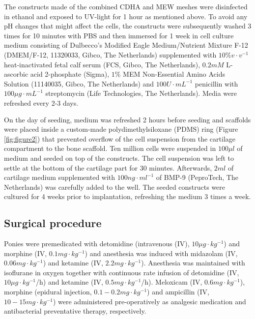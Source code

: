 \documentclass[twocolumn, empirical, authordate, issue]{jote-new-article}
\begin{document}
The constructs made of the combined CDHA and MEW meshes were disinfected in ethanol and exposed to UV-light for 1 hour as mentioned above. To avoid any pH changes that might affect the cells, the constructs were subsequently washed 3 times for 10 minutes with PBS and then immersed for 1 week in cell culture medium consisting of Dulbecco's Modified Eagle Medium/Nutrient Mixture F-12 (DMEM/F-12, 11320033, Gibco, The Netherlands) supplemented with $10\% v\cdot v^{-1}$
heat-inactivated fetal calf serum (FCS, Gibco, The Netherlands), $0.2 mM$ L-ascorbic acid 2-phosphate (Sigma), $1\%$ MEM Non-Essential Amino Acids Solution (11140035, Gibco, The Netherlands) and $100 U\cdot mL^{-1}$ penicillin with $100 \mu g\cdot mL^{-1}$
streptomycin (Life Technologies, The Netherlands). Media were refreshed every 2-3 days.

On the day of seeding, medium was refreshed 2 hours before seeding and scaffolds were placed inside a custom-made polydimethylsiloxane (PDMS) ring (Figure \ref{fig:figure2}) that prevented overflow of the cell suspension from the cartilage compartment to the bone scaffold. Ten million cells were suspended in $100 \mu l$ of medium and seeded on top of the constructs. The cell suspension was left to settle at the bottom of the cartilage part for 30 minutes. Afterwards, $2 ml$ of cartilage medium supplemented with $ 100 ng\cdot ml^{-1} $ of BMP-9 (PeproTech, The Netherlands) was carefully added to the well. The seeded constructs were cultured for 4 weeks prior to implantation, refreshing the medium 3 times a week.




\subsection{Surgical procedure} 


Ponies were premedicated with detomidine (intravenous (IV), $ 10 \mu g\cdot kg^{-1} $) and morphine (IV,  $0.1 mg\cdot kg^{-1} $) and anesthesia was induced with midazolam (IV, $ 0.06 mg\cdot kg^{-1} $) and ketamine (IV, $ 2.2 mg\cdot kg^{-1} $). Anesthesia was maintained with isoflurane in oxygen together with continuous rate infusion of detomidine (IV, $ 10 \mu g\cdot kg^{-1} $/h) and ketamine (IV, $ 0.5 mg\cdot kg^{-1} $/h). Meloxicam (IV, $ 0.6 mg\cdot kg^{-1} $), morphine (epidural injection, $0.1 - 0.2 mg\cdot kg^{-1} $) and ampicillin (IV, $10 - 15 mg\cdot kg^{-1} $) were administered pre-operatively as analgesic medication and antibacterial preventative therapy, respectively.
\end{document}
